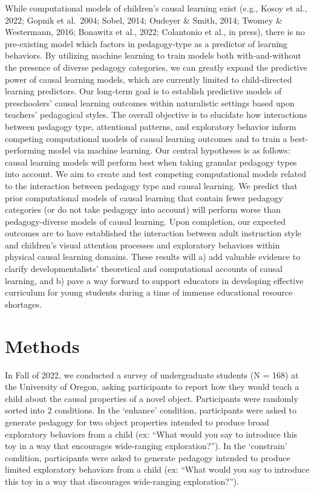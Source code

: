 \documentclass[
  english,
  man]{apa6}
\begin{document}
While computational models of children's causal learning exist (e.g., Kosoy et al., 2022; Gopnik et al.~2004; Sobel, 2014; Oudeyer \& Smith, 2014; Twomey \& Westermann, 2016; Bonawitz et al., 2022; Colantonio et al., in press), there is no pre-existing model which factors in pedagogy-type as a predictor of learning behaviors. By utilizing machine learning to train models both with-and-without the presence of diverse pedagogy categories, we can greatly expand the predictive power of causal learning models, which are currently limited to child-directed learning predictors.
Our long-term goal is to establish predictive models of preschoolers' causal learning outcomes within naturalistic settings based upon teachers' pedagogical styles. The overall objective is to elucidate how interactions between pedagogy type, attentional patterns, and exploratory behavior inform competing computational models of causal learning outcomes and to train a best-performing model via machine learning. Our central hypotheses is as follows: causal learning models will perform best when taking granular pedagogy types into account. We aim to create and test competing computational models related to the interaction between pedagogy type and causal learning. We predict that prior computational models of causal learning that contain fewer pedagogy categories (or do not take pedagogy into account) will perform worse than pedagogy-diverse models of causal learning. Upon completion, our expected outcomes are to have established the interaction between adult instruction style and children's visual attention processes and exploratory behaviors within physical causal learning domains. These results will a) add valuable evidence to clarify developmentalists' theoretical and computational accounts of causal learning, and b) pave a way forward to support educators in developing effective curriculum for young students during a time of immense educational resource shortages.

\hypertarget{methods}{%
\section{Methods}\label{methods}}

In Fall of 2022, we conducted a survey of undergraduate students (N = 168) at the University of Oregon, asking participants to report how they would teach a child about the causal properties of a novel object. Participants were randomly sorted into 2 conditions. In the `enhance' condition, participants were asked to generate pedagogy for two object properties intended to produce broad exploratory behaviors from a child (ex: ``What would you say to introduce this toy in a way that encourages wide-ranging exploration?''). In the `constrain' condition, participants were asked to generate pedagogy intended to produce limited exploratory behaviors from a child (ex: ``What would you say to introduce this toy in a way that discourages wide-ranging exploration?'').
\end{document}
